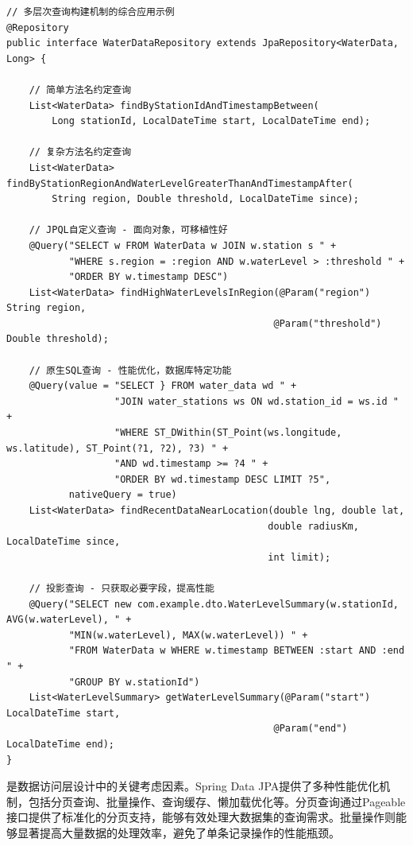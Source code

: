 \begin{lstlisting}[style=java]
// 多层次查询构建机制的综合应用示例
@Repository
public interface WaterDataRepository extends JpaRepository<WaterData, Long> {
    
    // 简单方法名约定查询
    List<WaterData> findByStationIdAndTimestampBetween(
        Long stationId, LocalDateTime start, LocalDateTime end);
    
    // 复杂方法名约定查询
    List<WaterData> findByStationRegionAndWaterLevelGreaterThanAndTimestampAfter(
        String region, Double threshold, LocalDateTime since);
    
    // JPQL自定义查询 - 面向对象，可移植性好
    @Query("SELECT w FROM WaterData w JOIN w.station s " +
           "WHERE s.region = :region AND w.waterLevel > :threshold " +
           "ORDER BY w.timestamp DESC")
    List<WaterData> findHighWaterLevelsInRegion(@Param("region") String region,
                                               @Param("threshold") Double threshold);
    
    // 原生SQL查询 - 性能优化，数据库特定功能
    @Query(value = "SELECT } FROM water_data wd " +
                   "JOIN water_stations ws ON wd.station_id = ws.id " +
                   "WHERE ST_DWithin(ST_Point(ws.longitude, ws.latitude), ST_Point(?1, ?2), ?3) " +
                   "AND wd.timestamp >= ?4 " +
                   "ORDER BY wd.timestamp DESC LIMIT ?5",
           nativeQuery = true)
    List<WaterData> findRecentDataNearLocation(double lng, double lat, 
                                              double radiusKm, LocalDateTime since, 
                                              int limit);
    
    // 投影查询 - 只获取必要字段，提高性能
    @Query("SELECT new com.example.dto.WaterLevelSummary(w.stationId, AVG(w.waterLevel), " +
           "MIN(w.waterLevel), MAX(w.waterLevel)) " +
           "FROM WaterData w WHERE w.timestamp BETWEEN :start AND :end " +
           "GROUP BY w.stationId")
    List<WaterLevelSummary> getWaterLevelSummary(@Param("start") LocalDateTime start,
                                               @Param("end") LocalDateTime end);
}
\end{lstlisting}

是数据访问层设计中的关键考虑因素。Spring Data JPA提供了多种性能优化机制，包括分页查询、批量操作、查询缓存、懒加载优化等。分页查询通过Pageable接口提供了标准化的分页支持，能够有效处理大数据集的查询需求。批量操作则能够显著提高大量数据的处理效率，避免了单条记录操作的性能瓶颈。

